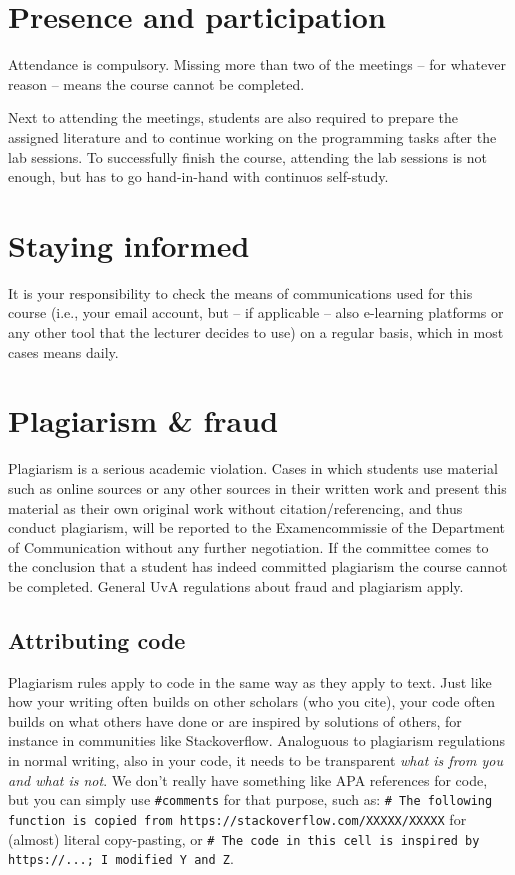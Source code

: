 \documentclass[a4paper,10pt,twocolumn]{report}
\begin{document}
\section{Presence and participation}
Attendance is compulsory. Missing more than two of the meetings – for whatever reason – means the course cannot be completed.

Next to attending the meetings, students are also required to prepare the assigned literature and to continue working on the programming tasks after the lab sessions. To successfully finish the course, attending the lab sessions is not enough, but has to go hand-in-hand with continuos self-study.


\section{Staying informed}
It is your responsibility to check the means of communications used for this course (i.e., your email account, but -- if applicable -- also e-learning platforms or any other tool that the lecturer decides to use) on a regular basis, which in most cases means daily.

\section{Plagiarism \& fraud}
Plagiarism is a serious academic violation. Cases in which students use material such as online sources or any other sources in their written work and present this material as their own original work without citation/referencing, and thus conduct plagiarism, will be reported to the Examencommissie of the Department of Communication without any further negotiation. If the committee comes to the conclusion that a student has indeed committed plagiarism the course cannot be completed.
General UvA regulations about fraud and plagiarism apply.

\subsection{Attributing code}
Plagiarism rules apply to code in the same way as they apply to text. Just like how your writing often builds on other scholars (who you cite), your code often builds on what others have done or are inspired by solutions of others, for instance in communities like Stackoverflow. Analoguous to plagiarism regulations in normal writing, also in your code, it needs to be transparent \emph{what is from you and what is not}. We don't really have something like APA references for code, but you can simply use \texttt{\#comments} for that purpose, such as:
\texttt{\# The following function is copied from https://stackoverflow.com/XXXXX/XXXXX} for (almost) literal copy-pasting, or \texttt{\# The code in this cell is inspired by https://...; I modified Y and Z}. 
\end{document}
